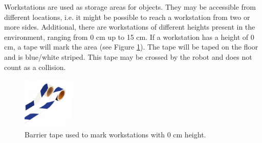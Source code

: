 


\begin{envSpec}[Workstations]
Workstations are used as storage areas for objects. They may be accessible from different locations, i.e. it might be possible to reach a workstation from two or more sides. Additional, there are workstations of different heights present in the environment, ranging from 0 cm up to 15 cm. If a workstation has a height of 0 cm, a tape will mark the area (see Figure \ref{fig:barrier_tape_0cm}). The tape will be taped on the floor and is blue/white striped. This tape may be crossed by the robot and does not count as a collision.
\end{envSpec}

\begin{figure} [h!]
	\begin{center}
		\includegraphics[height = 2.5cm]{pics/atwork/barrier_tape/barrier_tape_0cm_area.jpg}
	\end{center}
	\caption{Barrier tape used to mark workstations with 0 cm height.}
	\label{fig:barrier_tape_0cm}
\end{figure}


